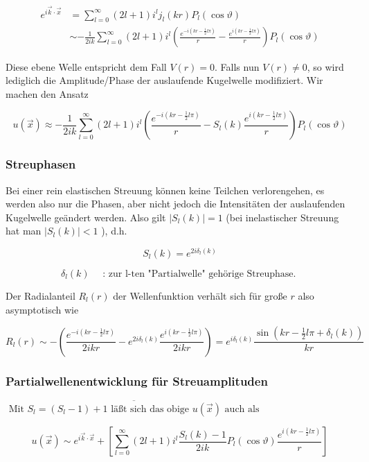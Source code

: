 \documentclass[10pt, letterpaper]{article}
\begin{document}
$$
\begin{aligned}
e^{i \vec{k} \cdot \vec{x}} & =\sum_{l=0}^{\infty}(2 l+1) i^{l} j_{l}(k r) P_{l}(\cos \vartheta) \\
& \sim-\frac{1}{2 i k} \sum_{l=0}^{\infty}(2 l+1) i^{l}\left(\frac{e^{-i\left(k r-\frac{1}{2} l \pi\right)}}{r}-\frac{e^{i\left(k r-\frac{1}{2} l \pi\right)}}{r}\right) P_{l}(\cos \vartheta)
\end{aligned}
$$

Diese ebene Welle entspricht dem Fall $V(r)=0$. Falls nun $V(r) \neq 0$, so wird lediglich die Amplitude/Phase der auslaufende Kugelwelle modifiziert. Wir machen den Ansatz

$$
u(\vec{x}) \approx-\frac{1}{2 i k} \sum_{l=0}^{\infty}(2 l+1) i^{l}\left(\frac{e^{-i\left(k r-\frac{1}{2} l \pi\right)}}{r}-S_{l}(k) \frac{e^{i\left(k r-\frac{1}{2} l \pi\right)}}{r}\right) P_{l}(\cos \vartheta)
$$

\subsubsection*{Streuphasen}
Bei einer rein elastischen Streuung können keine Teilchen verlorengehen, es werden also nur die Phasen, aber nicht jedoch die Intensitäten der auslaufenden Kugelwelle geändert werden. Also gilt $\left|S_{l}(k)\right|=1$ (bei inelastischer Streuung hat man $\left|S_{l}(k)\right|<1$ ), d.h.

$$
S_{l}(k)=e^{2 i \delta_{l}(k)}
$$

$$
\delta_{l}(k) \quad \text { : zur l-ten "Partialwelle" gehörige Streuphase. }
$$

Der Radialanteil $R_{l}(r)$ der Wellenfunktion verhält sich für große $r$ also asymptotisch wie

$$
R_{l}(r) \sim-\left(\frac{e^{-i\left(k r-\frac{1}{2} l \pi\right)}}{2 i k r}-e^{2 i \delta_{l}(k)} \frac{e^{i\left(k r-\frac{1}{2} l \pi\right)}}{2 i k r}\right)=e^{i \delta_{l}(k)} \frac{\sin \left(k r-\frac{1}{2} l \pi+\delta_{l}(k)\right)}{k r}
$$

\subsubsection*{Partialwellenentwicklung für Streuamplituden}
$\overline{\text { Mit } S_{l}=\left(S_{l}-1\right)+1 \text { läßt sich das obige } u(\vec{x}) \text { auch als }}$

$$
u(\vec{x}) \sim e^{i \vec{k} \cdot \vec{x}}+\left[\sum_{l=0}^{\infty}(2 l+1) i^{l} \frac{S_{l}(k)-1}{2 i k} P_{l}(\cos \vartheta) \frac{e^{i\left(k r-\frac{1}{2} l \pi\right)}}{r}\right]
$$
\end{document}
